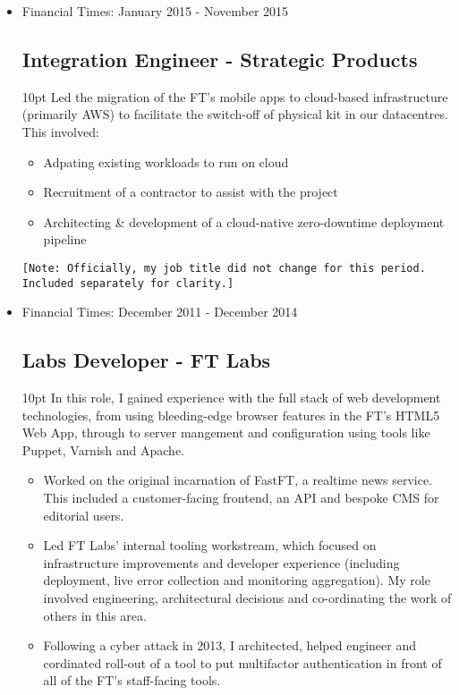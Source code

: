 \documentclass[a4paper]{article}
\newenvironment{detail}{\begin{adjustwidth}{10pt}{}}{\end{adjustwidth}}
\begin{document}
\begin{itemize}
\item Financial Times: January 2015 - November 2015
\subsection*{Integration Engineer - Strategic Products}
\begin{detail}
Led the migration of the FT's mobile apps to cloud-based infrastructure (primarily AWS) to facilitate the switch-off of physical kit in our datacentres.  This involved:
\begin{itemize}
	\item Adpating existing workloads to run on cloud
	\item Recruitment of a contractor to assist with the project
	\item Architecting \& development of a cloud-native zero-downtime deployment pipeline
\end{itemize}
\end{detail}

\small{\texttt{[Note: Officially, my job title did not change for this period. Included separately for clarity.]}}


\pagebreak

\item Financial Times: December 2011 - December 2014
\subsection*{Labs Developer - FT Labs}
\begin{detail}
In this role, I gained experience with the full stack of web development technologies, from using bleeding-edge browser features in the FT's HTML5 Web App, through to server mangement and configuration using tools like Puppet, Varnish and Apache.
\begin{itemize}
	\item Worked on the original incarnation of FastFT, a realtime news service.  This included a customer-facing frontend, an API and bespoke CMS for editorial users.
	\item Led FT Labs' internal tooling workstream, which focused on infrastructure improvements and developer experience (including deployment, live error collection and monitoring aggregation).  My role involved engineering, architectural decisions and co-ordinating the work of others in this area.
	\item Following a cyber attack in 2013, I architected, helped engineer and cordinated roll-out of a tool to put multifactor authentication in front of all of the FT's staff-facing tools.
\end{itemize}
\end{detail}



\end{itemize}
\end{document}

